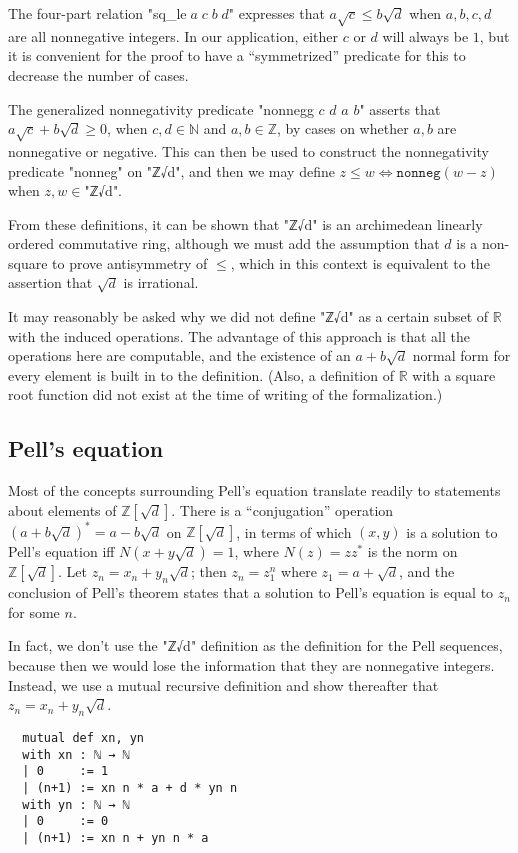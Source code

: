 \documentclass{llncs}
\newcommand{\N}{\mathbb{N}}
\newcommand{\Z}{\mathbb{Z}}
\begin{document}
The four-part relation "sq_le$\;a\;c\;b\;d$" expresses that $a\sqrt c\le b\sqrt d$ when $a,b,c,d$ are all nonnegative integers. In our application, either $c$ or $d$ will always be $1$, but it is convenient for the proof to have a ``symmetrized'' predicate for this to decrease the number of cases.

The generalized nonnegativity predicate "nonnegg $c$ $d$ $a$ $b$" asserts that $a\sqrt c+b\sqrt d\ge 0$, when $c,d\in\N$ and $a,b\in\Z$, by cases on whether $a,b$ are nonnegative or negative. This can then be used to construct the nonnegativity predicate "nonneg" on "ℤ√d", and then we may define $z\le w\iff \mathtt{nonneg}(w-z)$ when $z,w\in{}$"ℤ√d". 

From these definitions, it can be shown that "ℤ√d" is an archimedean linearly ordered commutative ring, although we must add the assumption that $d$ is a non-square to prove antisymmetry of $\le$, which in this context is equivalent to the assertion that $\sqrt d$ is irrational.

\begin{remark}
It may reasonably be asked why we did not define "ℤ√d" as a certain subset of $\mathbb{R}$ with the induced operations. The advantage of this approach is that all the operations here are computable, and the existence of an $a+b\sqrt d$ normal form for every element is built in to the definition. (Also, a definition of $\mathbb{R}$ with a square root function did not exist at the time of writing of the formalization.)
\end{remark}

\subsection{Pell's equation}
Most of the concepts surrounding Pell's equation translate readily to statements about elements of $\Z[\sqrt d]$. There is a ``conjugation'' operation $(a+b\sqrt d)^*=a-b\sqrt d$ on $\Z[\sqrt d]$, in terms of which $(x,y)$ is a solution to Pell's equation iff $N(x+y\sqrt d)=1$, where $N(z)=zz^*$ is the norm on $\Z[\sqrt d]$. Let $z_n=x_n+y_n\sqrt d$; then $z_n=z_1^n$ where $z_1=a+\sqrt d$, and the conclusion of Pell's theorem states that a solution to Pell's equation is equal to $z_n$ for some $n$.

\begin{remark}
In fact, we don't use the "ℤ√d" definition as the definition for the Pell sequences, because then we would lose the information that they are nonnegative integers. Instead, we use a mutual recursive definition and show thereafter that $z_n=x_n+y_n\sqrt d$.
\begin{lstlisting}
  mutual def xn, yn
  with xn : ℕ → ℕ
  | 0     := 1
  | (n+1) := xn n * a + d * yn n
  with yn : ℕ → ℕ
  | 0     := 0
  | (n+1) := xn n + yn n * a
\end{lstlisting}
\end{remark}
\end{document}
